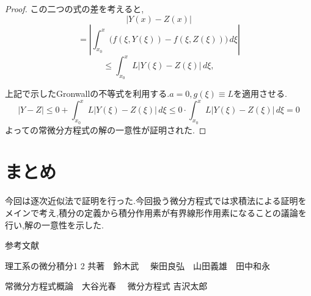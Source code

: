 \documentclass[12pt,xelatex,ja=standard]{bxjsarticle}
\begin{document}
\begin{proof}
この二つの式の差を考えると,
\[
|Y(x) - Z(x)|
\]
\[
= \left| \displaystyle \int_{x_{0}}^{x} \big( f(\xi, Y(\xi)) - f(\xi, Z(\xi)) \big) \, d\xi \right|
\]
\[
\leq \displaystyle \int_{x_{0}}^{x} L |Y(\xi) - Z(\xi)| \, d\xi,
\]


上記で示したGronwallの不等式を利用する.$a=0,g(\xi)\equiv L$を適用させる.
\[\left|Y-Z \right|\leq 0+\displaystyle \int_{x_{0}}^{x} L |Y(\xi) - Z(\xi)| \, d\xi \leq 0\cdot \displaystyle \int_{x_{0}}^{x} L |Y(\xi) - Z(\xi)| \, d\xi =0\]
よっての常微分方程式の解の一意性が証明された.
\end{proof}

\section{まとめ}
\label{sec:まとめ}
今回は逐次近似法で証明を行った.今回扱う微分方程式では求積法による証明をメインで考え,積分の定義から積分作用素が有界線形作用素になることの議論を行い,解の一意性を示した.

参考文献

理工系の微分積分1 2 共著$\quad$鈴木武$\quad$ 柴田良弘$\quad$山田義雄$\quad$田中和永

常微分方程式概論$\quad$大谷光春  $\quad$微分方程式 吉沢太郎
\end{document}
